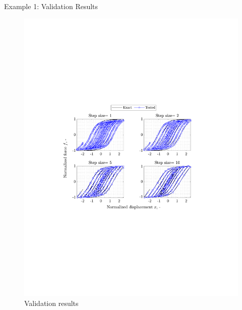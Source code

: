 \documentclass[9pt]{beamer}
\newcounter{frame}[frame]
\begin{document}
\begin{frame}{Example 1: Validation Results}
\begin{figure}
	\includegraphics[height=.8\textheight]{neuralNetHysteresis01Test}
	\caption{Validation results}
\end{figure}
\end{frame}
\end{document}

